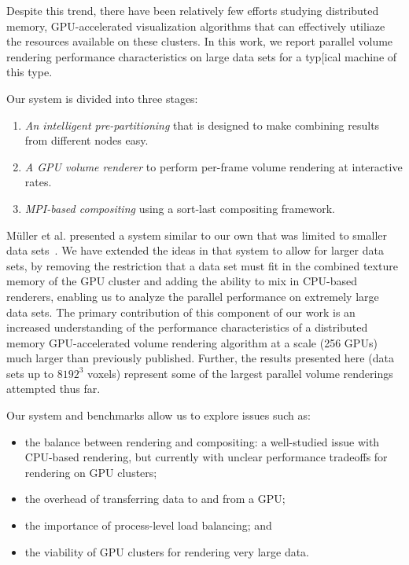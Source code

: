 Despite this trend, there have been relatively few efforts studying distributed
memory, GPU-accelerated visualization algorithms that can effectively utiliaze
the resources available on these clusters.  In this work, we report parallel
volume rendering performance characteristics on large data sets for a typ[ical
machine of this type.

Our system is divided into three stages:

\begin{enumerate}

  \item \emph{An intelligent pre-partitioning} that is designed to make
  combining results from different nodes easy.

  \item \emph{A GPU volume renderer} to perform per-frame volume
  rendering at interactive rates.

  \item \emph{MPI-based compositing} using a sort-last compositing framework.

\end{enumerate}

M\"uller et al. presented a system similar to our own that was limited
to smaller data sets~\cite{Needed}.  We have extended the ideas in that
system to allow for larger data sets, by removing the restriction that
a data set must fit in the combined texture memory of the GPU cluster
and adding the ability to mix in CPU-based renderers, enabling us to
analyze the parallel performance on extremely large data sets.  The
primary contribution of this component of our work is an increased
understanding of the performance characteristics of a distributed
memory GPU-accelerated volume rendering algorithm at a scale (256 GPUs)
much larger than previously published.  Further, the results presented
here (data sets up to $8192^3$ voxels) represent some of the largest
parallel volume renderings attempted thus far.

Our system and benchmarks allow us to explore issues such as:

\begin{itemize}

  \item the balance between rendering and compositing: a well-studied
  issue with CPU-based rendering, but currently with unclear
  performance tradeoffs for rendering on GPU clusters;

  \item the overhead of transferring data to and from a GPU;

  \item the importance of process-level load balancing; and

  \item the viability of GPU clusters for rendering very large data.

\end{itemize}

